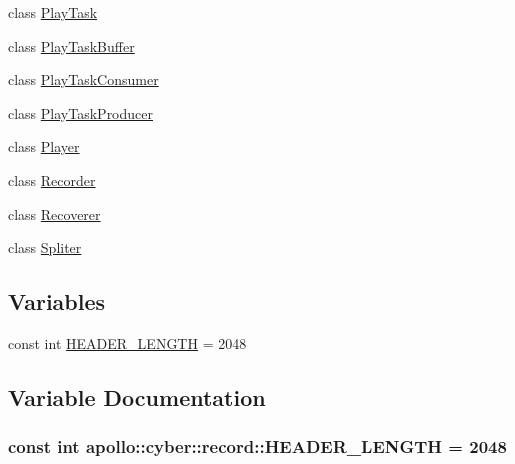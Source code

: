 \begin{DoxyCompactItemize}
\item 
class \hyperlink{classapollo_1_1cyber_1_1record_1_1PlayTask}{Play\-Task}
\item 
class \hyperlink{classapollo_1_1cyber_1_1record_1_1PlayTaskBuffer}{Play\-Task\-Buffer}
\item 
class \hyperlink{classapollo_1_1cyber_1_1record_1_1PlayTaskConsumer}{Play\-Task\-Consumer}
\item 
class \hyperlink{classapollo_1_1cyber_1_1record_1_1PlayTaskProducer}{Play\-Task\-Producer}
\item 
class \hyperlink{classapollo_1_1cyber_1_1record_1_1Player}{Player}
\item 
class \hyperlink{classapollo_1_1cyber_1_1record_1_1Recorder}{Recorder}
\item 
class \hyperlink{classapollo_1_1cyber_1_1record_1_1Recoverer}{Recoverer}
\item 
class \hyperlink{classapollo_1_1cyber_1_1record_1_1Spliter}{Spliter}
\end{DoxyCompactItemize}
\subsection*{Variables}
\begin{DoxyCompactItemize}
\item 
const int \hyperlink{namespaceapollo_1_1cyber_1_1record_afa8c164e9d516ce65e39bcc9d3689a05}{H\-E\-A\-D\-E\-R\-\_\-\-L\-E\-N\-G\-T\-H} = 2048
\end{DoxyCompactItemize}


\subsection{Variable Documentation}
\hypertarget{namespaceapollo_1_1cyber_1_1record_afa8c164e9d516ce65e39bcc9d3689a05}{
\subsubsection[{H\-E\-A\-D\-E\-R\-\_\-\-L\-E\-N\-G\-T\-H}]{\setlength{\rightskip}{0pt plus 5cm}const int apollo\-::cyber\-::record\-::\-H\-E\-A\-D\-E\-R\-\_\-\-L\-E\-N\-G\-T\-H = 2048}}\label{namespaceapollo_1_1cyber_1_1record_afa8c164e9d516ce65e39bcc9d3689a05}
